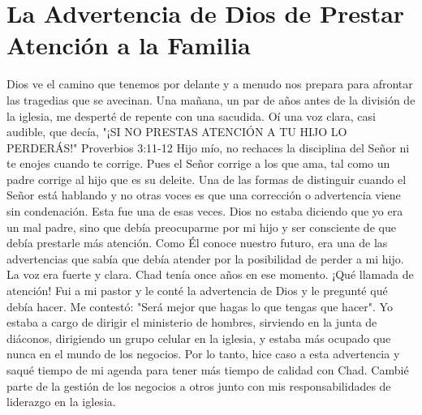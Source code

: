 \documentclass[twoside, 12pt]{book}
\begin{document}
 
\section{La Advertencia de Dios de Prestar Atención a la Familia}

Dios ve el camino que tenemos por delante y a menudo nos prepara para afrontar las tragedias que se avecinan. Una mañana, un par de años antes de la división de la iglesia, me desperté de repente con una sacudida. Oí una voz clara, casi audible, que decía, "¡SI NO PRESTAS ATENCIÓN A TU HIJO LO PERDERÁS!" Proverbios 3:11-12 Hijo mío, no rechaces la disciplina del Señor ni te enojes cuando te corrige. Pues el Señor corrige a los que ama, tal como un padre corrige al hijo que es su deleite. Una de las formas de distinguir cuando el Señor está hablando y no otras voces es que una corrección o advertencia viene sin condenación. Esta fue una de esas veces. Dios no estaba diciendo que yo era un mal padre, sino que debía preocuparme por mi hijo y ser consciente de que debía prestarle más atención. Como Él conoce nuestro futuro, era una de las advertencias que sabía que debía atender por la posibilidad de perder a mi hijo. La voz era fuerte y clara. Chad tenía once años en ese momento. ¡Qué llamada de atención! Fui a mi pastor y le conté la advertencia de Dios y le pregunté qué debía hacer. Me contestó: "Será mejor que hagas lo que tengas que hacer". Yo estaba a cargo de dirigir el ministerio de hombres, sirviendo en la junta de diáconos, dirigiendo un grupo celular en la iglesia, y estaba más ocupado que nunca en el mundo de los negocios. Por lo tanto, hice caso a esta advertencia y saqué tiempo de mi agenda para tener más tiempo de calidad con Chad. Cambié parte de la gestión de los negocios a otros junto con mis responsabilidades de liderazgo en la iglesia.\\
\end{document}
